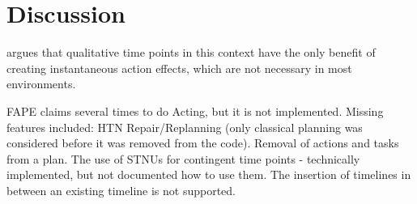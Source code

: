 \section{Discussion}\label{sec:discussion}


\cite{bit-monnotTemporalHierarchicalModels2017} argues that qualitative time points in this context have the only benefit of creating instantaneous action effects, which are not necessary in most environments.

FAPE claims several times to do Acting, but it is not implemented.
Missing features included: 
HTN Repair/Replanning (only classical planning was considered before it was removed from the code). 
Removal of actions and tasks from a plan.
The use of STNUs for contingent time points - technically implemented, but not documented how to use them.
The insertion of timelines in between an existing timeline is not supported.